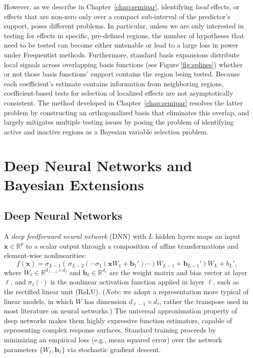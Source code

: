 However, as we describe in Chapter~\ref{chap:semipar}, identifying \emph{local} effects, or effects that are non-zero only over a compact
sub-interval of the predictor's support, poses different problems.  In particular, unless we are only interested in testing for effects in specific, pre-defined regions, the number of hypotheses that need to be tested can become either untenable or lead to a large loss in power under Frequentist methods.  Furthermore, standard basis expansions distribute local signals across overlapping basis
functions (see Figure \ref{fig:splines}) whether or not those basis functions' support contains the region being tested. Because each coefficient's estimate contains information from neighboring regions, coefficient-based tests for selection of localized effects are not asymptotically
consistent. 
The method developed in Chapter~\ref{chap:semipar}
resolves the latter problem by constructing an orthogonalized basis that
eliminates this overlap, and largely mitigates multiple testing issues by posing the problem of identifying active and inactive regions as a Bayesian variable selection problem.

\section{Deep Neural Networks and Bayesian Extensions}
\label{sec:intro-nn}

\subsection{Deep Neural Networks}
\label{subsec:dnn}

A \emph{deep feedforward neural network} (DNN) with $L$ hidden layers
maps an input $\mathbf{x} \in \mathbb{R}^p$ to a scalar output
through a composition of affine transformations and element-wise
nonlinearities:
\begin{equation}
  f(\mathbf{x})
  = \sigma_{L-1}\left(\,\sigma_{L-2}\!\left(\cdots
    \sigma_1(\mathbf{x}W_1  + \mathbf{b}_1') \cdots
    \right)W_{L-1} + \mathbf{b}_{L-1}'\right)W_L + b_L',
  \label{eq:dnn}
\end{equation}
where $W_\ell \in \mathbb{R}^{d_{\ell-1} \times d_{\ell}}$ and
$\mathbf{b}_\ell \in \mathbb{R}^{d_\ell}$ are the weight matrix
and bias vector at layer $\ell$, and $\sigma_\ell(\cdot)$ is the
nonlinear activation function applied in layer $\ell$, such as the rectified linear unit
(ReLU).  (\textit{Note}: we adopt a representation more typical of linear models, in which $W$ has dimension $d_{\ell-1} \times d_\ell$, rather the transpose used in most literature on neural networks.)
The universal approximation property of deep networks
makes them highly expressive function estimators, capable of
representing complex response surfaces. Standard training proceeds by minimizing an empirical
loss (e.g., mean squared error) over the network parameters
$\{W_\ell, \mathbf{b}_\ell\}$ via stochastic gradient descent.  

